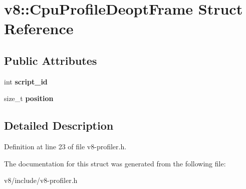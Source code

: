 \hypertarget{structv8_1_1CpuProfileDeoptFrame}{}\section{v8\+:\+:Cpu\+Profile\+Deopt\+Frame Struct Reference}
\label{structv8_1_1CpuProfileDeoptFrame}
\subsection*{Public Attributes}
\begin{DoxyCompactItemize}
\item 
\mbox{\label{structv8_1_1CpuProfileDeoptFrame_af7b750288458a70a81b4c05869b8f6d7}} 
int {\bfseries script\+\_\+id}
\item 
\mbox{\label{structv8_1_1CpuProfileDeoptFrame_a4f82d1517fd15573bb2890961496a76f}} 
size\+\_\+t {\bfseries position}
\end{DoxyCompactItemize}


\subsection{Detailed Description}


Definition at line 23 of file v8-\/profiler.\+h.



The documentation for this struct was generated from the following file\+:\begin{DoxyCompactItemize}
\item 
v8/include/v8-\/profiler.\+h\end{DoxyCompactItemize}
